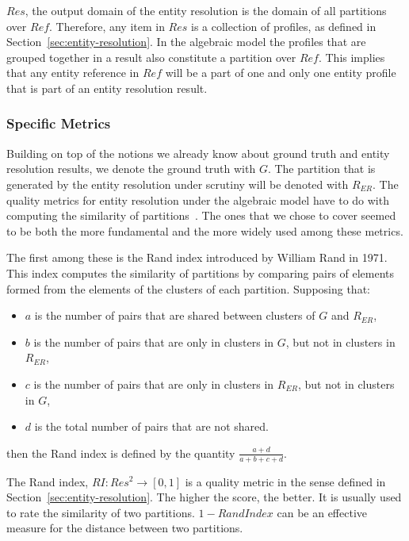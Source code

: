 $Res$, the output domain of the entity resolution is the domain of all
partitions over $Ref$.
Therefore, any item in $Res$ is a collection of profiles, as defined in
Section~\ref{sec:entity-resolution}.
In the algebraic model the profiles that are grouped together in a result also
constitute a partition over $Ref$.
This implies that any entity reference in $Ref$ will be a part of one and only
one entity profile that is part of an entity resolution result.

\subsubsection[algeval]{Specific Metrics}\label{subsubsec:algeval}

Building on top of the notions we already know about ground truth and entity
resolution results, we denote the ground truth with $G$.
The partition that is generated by the entity resolution under scrutiny will be
denoted with $R_{ER}$. 
The quality metrics for entity resolution under the algebraic model have to
do with computing the similarity of partitions~\cite{hitesh2012}.
The ones that we chose to cover seemed to be both the more fundamental and the
more widely used among these metrics.

The first among these is the Rand index introduced by William Rand in
1971\cite{rand1971}.
This index computes the similarity of partitions by comparing pairs of
elements formed from the elements of the clusters of each partition.
Supposing that:
\begin{itemize}
    \item $a$ is the number of pairs that are shared between clusters of $G$
    and $R_{ER}$,
    \item $b$ is the number of pairs that are only in clusters in $G$, but
    not in clusters in $R_{ER}$,
    \item $c$ is the number of pairs that are only in clusters in $R_{ER}$, but
    not in clusters in $G$,
    \item $d$ is the total number of pairs that are not shared.
\end{itemize}
then the Rand index is defined by the quantity
$\frac{a+d}{a+b+c+d}$\cite{adjrand2001}.

The Rand index, $RI : Res^2 \rightarrow \left[0, 1\right]$ is a quality metric
in the sense defined in Section~\ref{sec:entity-resolution}.
The higher the score, the better.
It is usually used to rate the similarity of two partitions.
$1 - Rand Index$ can be an effective measure for the distance between two
partitions.

